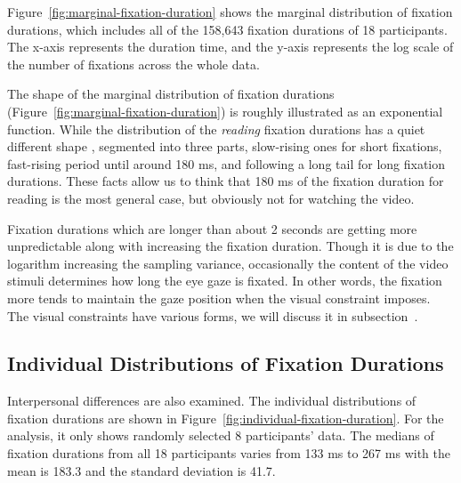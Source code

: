 \documentclass[10pt,letterpaper]{article}
\begin{document}
Figure~\ref{fig:marginal-fixation-duration} shows the marginal distribution of fixation durations, which includes all of the 158,643 fixation durations of 18 participants. The x-axis represents the duration time, and the y-axis represents the log scale of the number of fixations across the whole data.

The shape of the marginal distribution of fixation durations (Figure~\ref{fig:marginal-fixation-duration}) is roughly illustrated as an exponential function. While the distribution of the \textit{reading} fixation durations has a quiet different shape \cite{Feng2006}, segmented into three parts, slow-rising ones for short fixations, fast-rising period until around 180 ms, and following a long tail for long fixation durations. These facts allow us to think that 180 ms of the fixation duration for reading is the most general case, but obviously not for watching the video.

Fixation durations which are longer than about 2 seconds are getting more unpredictable along with increasing the fixation duration. Though it is due to the logarithm increasing the sampling variance, occasionally the content of the video stimuli determines how long the eye gaze is fixated. In other words, the fixation more tends to maintain the gaze position when the visual constraint imposes. The visual constraints have various forms, we will discuss it in subsection~.


\subsection{Individual Distributions of Fixation Durations}

Interpersonal differences are also examined. The individual distributions of fixation durations are shown in Figure~\ref{fig:individual-fixation-duration}. For the analysis, it only shows randomly selected 8 participants' data. The medians of fixation durations from all 18 participants varies from 133 ms to 267 ms with the mean is 183.3 and the standard deviation is 41.7.
\end{document}
